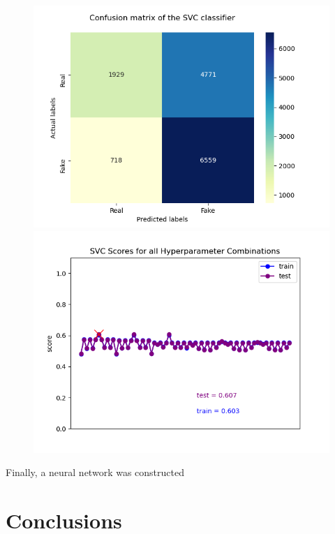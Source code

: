\documentclass[10pt,twocolumn,letterpaper]{article}
\begin{document}
\begin{figure}[h]
   \begin{center}
        \includegraphics[width=\linewidth]{Latex_Report/report/Graphs/SVC/confusion_matrix.png}
        \includegraphics[width=\linewidth]{Latex_Report/report/Graphs/SVC/scores_plot.png}
   \end{center}
        \vspace*{-5mm}
        \caption{\label{fifth_figure}}
\end{figure}

Finally, a neural network was constructed 

\section{Conclusions}
\end{document}
